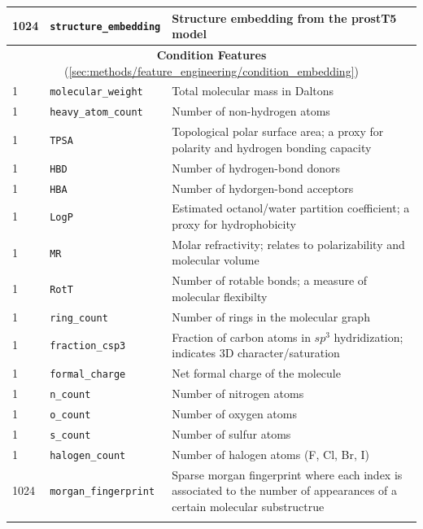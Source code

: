\begin{longtable}{|p{1.5cm}||p{5cm}|p{8cm}|}
1024 &\texttt{structure\_embedding} & Structure embedding from the \gls{prostT5} model \\[4pt]
\hline
\hline
\multicolumn{3}{c}{\textbf{Condition Features} (\ref{sec:methods/feature_engineering/condition_embedding})} \\[4pt]
\hline
1 & \texttt{molecular\_weight} & Total molecular mass in Daltons \\ \hline
1 & \texttt{heavy\_atom\_count} & Number of non-hydrogen atoms \\ \hline
1 & \texttt{TPSA} & Topological polar surface area; a proxy for polarity and hydrogen bonding capacity \\ \hline
1 & \texttt{HBD} & Number of hydrogen-bond donors \\ \hline
1 & \texttt{HBA} & Number of hydorgen-bond acceptors \\ \hline
1 & \texttt{LogP} & Estimated octanol/water partition coefficient; a proxy for hydrophobicity \\ \hline
1 & \texttt{MR} & Molar refractivity; relates to polarizability and molecular volume \\ \hline
1 & \texttt{RotT} & Number of rotable bonds; a measure of molecular flexibilty \\ \hline
1 & \texttt{ring\_count} & Number of rings in the molecular graph \\ \hline
1 & \texttt{fraction\_csp3} & Fraction of carbon atoms in $sp^3$ hydridization; indicates 3D character/saturation\\ \hline
1 & \texttt{formal\_charge} & Net formal charge of the molecule \\ \hline
1 & \texttt{n\_count} & Number of nitrogen atoms \\ \hline
1 & \texttt{o\_count} & Number of oxygen atoms \\ \hline
1 & \texttt{s\_count} & Number of sulfur atoms \\ \hline
1 & \texttt{halogen\_count} & Number of halogen atoms (F, Cl, Br, I) \\ \hline
1024 & \texttt{morgan\_fingerprint} & Sparse morgan fingerprint where each index is associated to the number of appearances of a certain molecular substructrue \\
\hline
\label{tab:feature_table}
\end{longtable}
